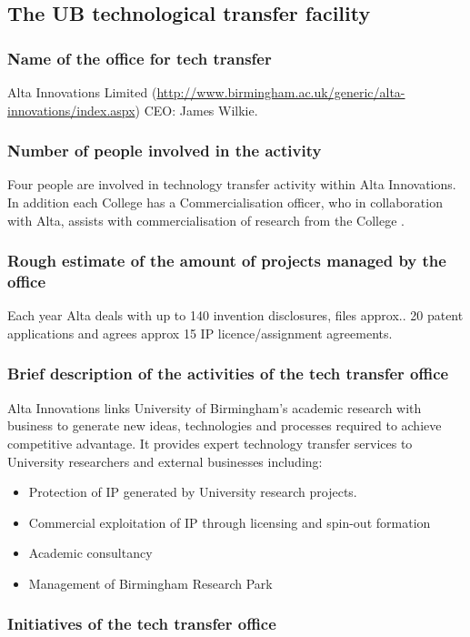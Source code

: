 \documentclass[12pt,a4paper,twoside]{article}
\begin{document}
\subsection{The UB technological transfer facility}

\subsubsection{Name of the office for tech transfer}
Alta Innovations Limited (\url{http://www.birmingham.ac.uk/generic/alta-innovations/index.aspx})
CEO: James Wilkie.

\subsubsection{Number of people involved in the activity }
Four people are involved in technology transfer activity within Alta Innovations. In addition each College has a Commercialisation officer, who in collaboration with Alta, assists with commercialisation of research from the College .

\subsubsection{Rough estimate of the amount of projects managed by the office}
Each year Alta deals with up to 140 invention disclosures, files approx.. 20 patent applications and agrees approx 15 IP licence/assignment agreements.

\subsubsection{Brief description of the activities of the tech transfer office}
Alta Innovations links University of Birmingham’s academic research with business to generate new ideas, technologies and processes required to achieve competitive advantage. It provides expert technology transfer services to University researchers and external businesses including:
\begin{itemize}
\item Protection of IP generated by University research projects.
\item Commercial exploitation of IP through licensing and spin-out formation
\item Academic consultancy
\item Management of Birmingham Research Park
\end{itemize}
\subsubsection{Initiatives of the tech transfer office}
\end{document}

